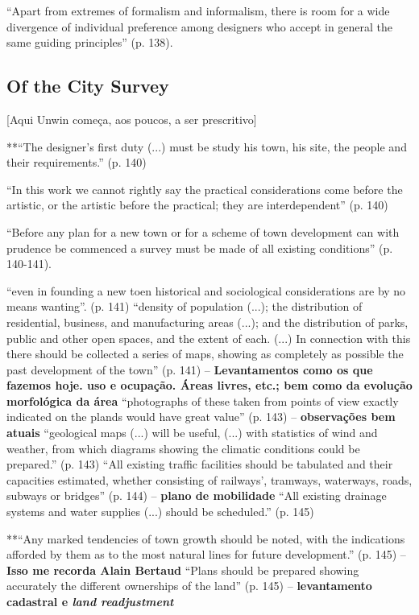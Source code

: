 \documentclass[12pt, a4paper]{book} %
\begin{document}
        ``Apart from extremes of formalism and informalism, there is room for a wide divergence of individual preference among designers who accept in general the same guiding principles'' (p. 138).

        \subsection*{Of the City Survey}

        [Aqui Unwin começa, aos poucos, a ser prescritivo]

        **``The designer's first duty (...) must be study his town, his site, the people and their requirements.'' (p. 140)

        ``In this work we cannot rightly say the practical considerations come before the artistic, or the artistic before the practical; they are interdependent'' (p. 140)

        ``Before any plan for a new town or for a scheme of town development can with prudence be commenced a survey must be made of all existing conditions'' (p. 140-141).

        ``even in founding a new toen historical and sociological considerations are by no means wanting''. (p. 141)
        ``density of population (...); the distribution of residential, business, and manufacturing areas (...); and the distribution of parks, public and other open spaces, and the extent of each. (...) In connection with this there should be collected a series of maps, showing as completely as possible the past development of the town'' (p. 141) – \textbf{Levantamentos como os que fazemos hoje. uso e ocupação. Áreas livres, etc.; bem como da evolução morfológica da área}
        ``photographs of these taken from points of view exactly indicated on the plands would have great value'' (p. 143) – \textbf{observações bem atuais}
        ``geological maps (...) will be useful, (...) with statistics of wind and weather, from which diagrams showing the climatic conditions could be prepared.'' (p. 143)
        ``All existing traffic facilities should be tabulated and their capacities estimated, whether consisting of railways', tramways, waterways, roads, subways or bridges'' (p. 144) – \textbf{plano de mobilidade}
        ``All existing drainage systems and water supplies (...) should be scheduled.'' (p. 145)
        
        **``Any marked tendencies of town growth should be noted, with the indications afforded by them as to the most natural lines for future development.'' (p. 145) – \textbf{Isso me recorda Alain Bertaud}
        ``Plans should be prepared showing accurately the different ownerships of the land'' (p. 145) – \textbf{levantamento cadastral e \textit{land readjustment}}
\end{document}
